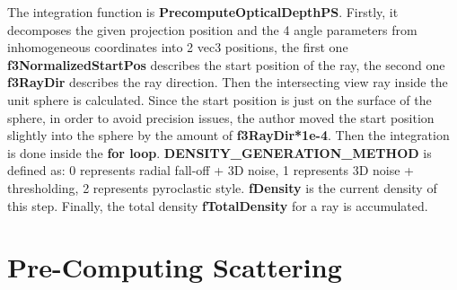 The integration function is \textbf{PrecomputeOpticalDepthPS}. Firstly, it decomposes the given projection position and the 4 angle parameters from inhomogeneous coordinates into 2 vec3 positions, the first one \textbf{f3NormalizedStartPos} describes the start position of the ray, the second one \textbf{f3RayDir} describes the ray direction. Then the intersecting view ray inside the unit sphere is calculated. Since the start position is just on the surface of the sphere, in order to avoid precision issues, the author moved the start position slightly into the sphere by the amount of \textbf{f3RayDir*1e-4}. Then the integration is done inside the \textbf{for loop}. \textbf{DENSITY\_GENERATION\_METHOD} is defined as: 0 represents radial fall-off + 3D noise, 1 represents 3D noise + thresholding, 2 represents pyroclastic style.
\textbf{fDensity} is the current density of this step. Finally, the total density \textbf{fTotalDensity} for a ray is accumulated.


\section{Pre-Computing Scattering}
